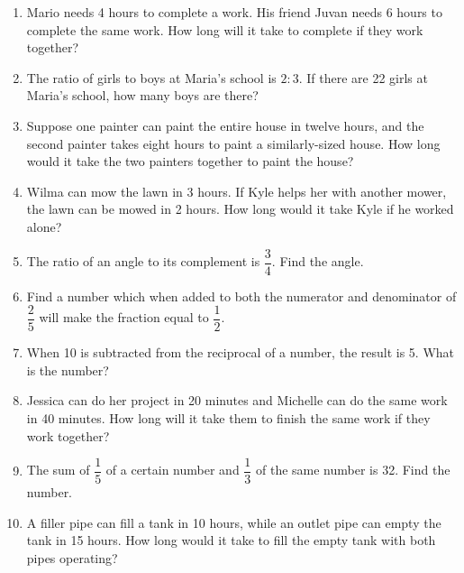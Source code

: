     \begin{enumerate}[resume]
    		\item Mario needs 4 hours to complete a work. His friend Juvan needs 6 hours to complete the same work. How long will it take to complete if they work together?	%
    		\item The ratio of girls to boys at Maria's school is $ 2:3 $. If there are 22 girls at Maria's school, how many boys are there?	%
    		\item Suppose one painter can paint the entire house in twelve hours, and the second painter takes eight hours to paint a similarly-sized house. How long would it take the two painters together to paint the house?	%
    		\item Wilma can mow the lawn in 3 hours. If Kyle helps her with another mower, the lawn can be mowed in 2 hours. How long would it take Kyle if he worked alone? 	%
    		\item The ratio of an angle to its complement is $ \dfrac{3}{4} $. Find the angle.	%
    		\item Find a number which when added to both the numerator and denominator of $ \dfrac{2}{5} $ will make the fraction equal to $ \dfrac{1}{2} $.	%
    		\item When 10 is subtracted from the reciprocal of a number, the result is 5. What is the number?	%
    		\item Jessica can do her project in 20 minutes and Michelle can do the same work in 40 minutes. How long will it take them to finish the same work if they work together?	%
    		\item The sum of $ \dfrac{1}{5} $ of a certain number and $ \dfrac{1}{3} $ of the same number is 32. Find the number. %
    		\item A filler pipe can fill a tank in 10 hours, while an outlet pipe can empty the tank in 15 hours. How long would it take to fill the empty tank with both pipes operating?	%
    \end{enumerate}


